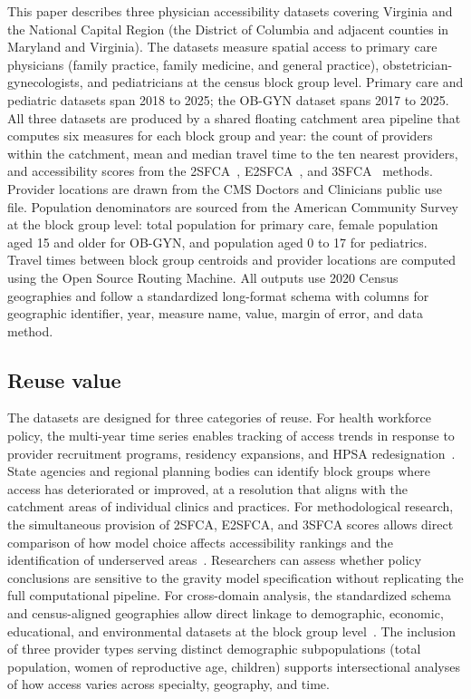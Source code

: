 \documentclass{CUP-JNL-DAP}%
\begin{document}
This paper describes three physician accessibility datasets covering Virginia and the National Capital Region (the District of Columbia and adjacent counties in Maryland and Virginia). The datasets measure spatial access to primary care physicians (family practice, family medicine, and general practice), obstetrician-gynecologists, and pediatricians at the census block group level. Primary care and pediatric datasets span 2018 to 2025; the OB-GYN dataset spans 2017 to 2025. All three datasets are produced by a shared floating catchment area pipeline that computes six measures for each block group and year: the count of providers within the catchment, mean and median travel time to the ten nearest providers, and accessibility scores from the 2SFCA~\citep{luo2003}, E2SFCA~\citep{luo2009}, and 3SFCA~\citep{wan2012} methods. Provider locations are drawn from the CMS Doctors and Clinicians public use file. Population denominators are sourced from the American Community Survey at the block group level: total population for primary care, female population aged 15 and older for OB-GYN, and population aged 0 to 17 for pediatrics. Travel times between block group centroids and provider locations are computed using the Open Source Routing Machine. All outputs use 2020 Census geographies and follow a standardized long-format schema with columns for geographic identifier, year, measure name, value, margin of error, and data method.

\subsection{Reuse value}

The datasets are designed for three categories of reuse. For health workforce policy, the multi-year time series enables tracking of access trends in response to provider recruitment programs, residency expansions, and HPSA redesignation~\citep{hrsa2024,crs2023}. State agencies and regional planning bodies can identify block groups where access has deteriorated or improved, at a resolution that aligns with the catchment areas of individual clinics and practices. For methodological research, the simultaneous provision of 2SFCA, E2SFCA, and 3SFCA scores allows direct comparison of how model choice affects accessibility rankings and the identification of underserved areas~\citep{luo2003,luo2009,wan2012,saxena2023}. Researchers can assess whether policy conclusions are sensitive to the gravity model specification without replicating the full computational pipeline. For cross-domain analysis, the standardized schema and census-aligned geographies allow direct linkage to demographic, economic, educational, and environmental datasets at the block group level~\citep{drescher2023,andrew2024,daras2019}. The inclusion of three provider types serving distinct demographic subpopulations (total population, women of reproductive age, children) supports intersectional analyses of how access varies across specialty, geography, and time.
\end{document}
